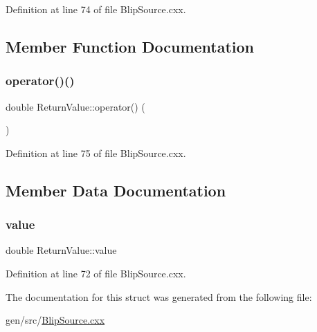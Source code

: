 Definition at line 74 of file Blip\+Source.\+cxx.



\subsection{Member Function Documentation}
\mbox{\label{struct_return_value_a03b651a83bbd14cbd07e142ae4bdb239}} 
\subsubsection{\texorpdfstring{operator()()}{operator()()}}
{\footnotesize\ttfamily double Return\+Value\+::operator() (\begin{DoxyParamCaption}{ }\end{DoxyParamCaption})\hspace{0.3cm}{\ttfamily [inline]}}



Definition at line 75 of file Blip\+Source.\+cxx.



\subsection{Member Data Documentation}
\mbox{\label{struct_return_value_a46feee1ef2a062fef2e3451a6f61a47e}} 
\subsubsection{\texorpdfstring{value}{value}}
{\footnotesize\ttfamily double Return\+Value\+::value}



Definition at line 72 of file Blip\+Source.\+cxx.



The documentation for this struct was generated from the following file\+:\begin{DoxyCompactItemize}
\item 
gen/src/\hyperlink{_blip_source_8cxx}{Blip\+Source.\+cxx}\end{DoxyCompactItemize}
